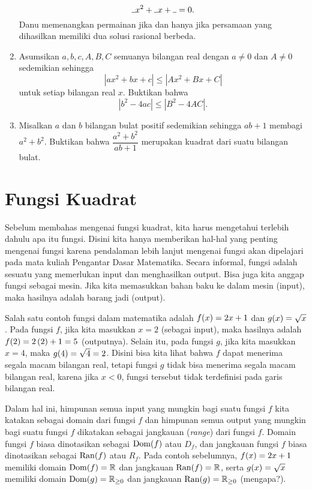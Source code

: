 \begin{enumerate}[topsep=0pt]
			\[ \rule{1ex}{.4pt}x^{2} + \rule{1ex}{.4pt}x + \rule{1ex}{.4pt} = 0. \]
			Danu memenangkan permainan jika dan hanya jika persamaan yang dihasilkan memiliki dua solusi rasional berbeda.
			\item {} \probtype{**} Asumsikan $ a, b, c, A, B, C $ semuanya bilangan real dengan $ a \ne 0 $ dan $ A \ne 0 $ sedemikian sehingga
			\[ \left|ax^{2} + bx + c\right| \leq \left|Ax^{2} + Bx + C\right| \]
			untuk setiap bilangan real $ x $. Buktikan bahwa
			\[ \left|b^{2} - 4ac\right| \leq \left|B^{2} - 4AC\right|. \]
			\item {} \probtype{**} Misalkan $ a $ dan $ b $ bilangan bulat positif sedemikian sehingga $ ab + 1 $ membagi $ a^{2} + b^{2} $. Buktikan bahwa $ \dfrac{a^{2} + b^{2}}{ab + 1} $ merupakan kuadrat dari suatu bilangan bulat.
		\end{enumerate}

\newpage


\section{Fungsi Kuadrat}

Sebelum membahas mengenai fungsi kuadrat, kita harus mengetahui terlebih dahulu apa itu fungsi. Disini kita hanya memberikan hal-hal yang penting mengenai fungsi karena pendalaman lebih lanjut mengenai fungsi akan dipelajari pada mata kuliah Pengantar Dasar Matematika. Secara informal, fungsi adalah sesuatu yang memerlukan input dan menghasilkan output. Bisa juga kita anggap fungsi sebagai mesin. Jika kita memasukkan bahan baku ke dalam mesin (input), maka hasilnya adalah barang jadi (output).

\par Salah satu contoh fungsi dalam matematika adalah $ \mathop{}\!{f}{\left({x}\right)} = 2x + 1 $ dan $ \mathop{}\!{g}{\left({x}\right)} = \sqrt{x} $. Pada fungsi $ f $, jika kita masukkan $ x = 2 $ (sebagai input), maka hasilnya adalah $ \mathop{}\!{f}{\left({2}\right)} = 2\left(2\right) + 1 = 5 $ (outputnya). Selain itu, pada fungsi $ g $, jika kita masukkan $ x = 4 $, maka $ \mathop{}\!{g}{\left({4}\right)} = \sqrt{4} = 2 $. Disini bisa kita lihat bahwa $ f $ dapat menerima segala macam bilangan real, tetapi fungsi $ g $ tidak bisa menerima segala macam bilangan real, karena jika $ x < 0 $, fungsi tersebut tidak terdefinisi pada garis bilangan real.

\par Dalam hal ini, himpunan semua input yang mungkin bagi suatu fungsi $ f $ kita katakan sebagai domain dari fungsi $ f $ dan himpunan semua output yang mungkin bagi suatu fungsi $ f $ dikatakan sebagai jangkauan (\textit{range}) dari fungsi $ f $. Domain fungsi $ f $ biasa dinotasikan sebagai $ \mathop{}\!{\operatorname{Dom}}{\left({f}\right)} $ atau $ D_{f} $, dan jangkauan fungsi $ f $ biasa dinotasikan sebagai $ \mathop{}\!{\operatorname{Ran}}{\left({f}\right)} $ atau $ R_{f} $. Pada contoh sebelumnya, $ \mathop{}\!{f}{\left({x}\right)} = 2x + 1 $ memiliki domain $ \mathop{}\!{\operatorname{Dom}}{\left({f}\right)} = \mathbb{R} $ dan jangkauan $ \mathop{}\!{\operatorname{Ran}}{\left({f}\right)} = \mathbb{R} $, serta $ \mathop{}\!{g}{\left({x}\right)} = \sqrt{x} $ memiliki domain $ \mathop{}\!{\operatorname{Dom}}{\left({g}\right)} = \mathbb{R}_{\geq 0} $ dan jangkauan $ \mathop{}\!{\operatorname{Ran}}{\left({g}\right)} = \mathbb{R}_{\geq 0} $ (mengapa?).

